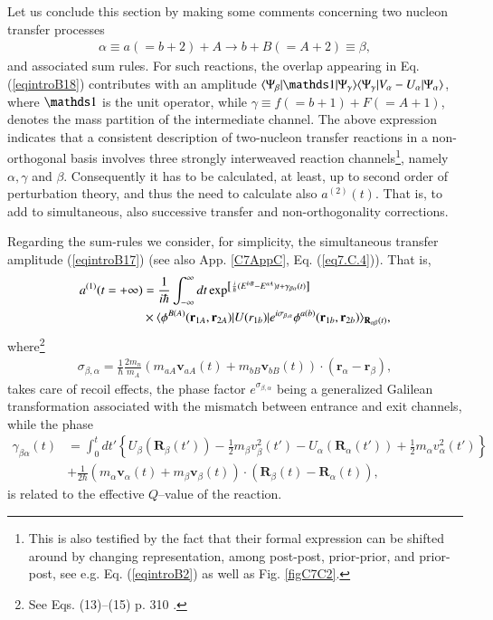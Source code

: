 \begin{subappendices}
 Let us conclude this section by making some comments concerning two nucleon transfer processes
 \begin{align}
 \alpha\equiv a (=b+2)+A\rightarrow b+B(=A+2)\equiv\beta,
 \end{align}
 and associated sum rules.
 For such reactions, the overlap appearing in Eq. (\ref{eqintroB18}) 
 contributes with an amplitude $\braket{\Psi_\beta|\idop|\Psi_\gamma}\braket{\Psi_\gamma|V_\alpha-U_\alpha|\Psi_\alpha}$, where $\idop$ is the unit operator, while $\gamma\equiv f(=b+1)+F(=A+1)$, denotes the mass partition of the intermediate channel. 
 The above expression indicates that a consistent description of two-nucleon transfer reactions in a non-orthogonal basis involves  three strongly interweaved  reaction channels\footnote{This is also testified by the fact that their formal expression can be shifted around by changing representation, among  post-post, prior-prior, and prior-post, see e.g. Eq. (\ref{eqintroB2}) as well as Fig. \ref{figC7C2}.}, namely $\alpha,\gamma$ and $\beta$. Consequently it has to be calculated, at least, up to second order of perturbation theory, and thus the need to calculate also $a^{(2)}(t)$. That is, to add to simultaneous, also successive transfer and non-orthogonality corrections.
 
 Regarding the sum-rules  we consider,  for simplicity, the simultaneous transfer amplitude (\ref{eqintroB17}) (see also App. \ref{C7AppC}, Eq. (\ref{eq7.C.4})). That is,
 \begin{align}\label{eqintroB19}
 \nonumber a^{(1)}(t=+\infty)&=\frac{1}{i\hbar}\int^{\infty}_{-\infty}dt\exp^{\left[\frac{i}{\hbar}(E^{bB}-E^{aA})t+\gamma_{\beta\alpha}(t)\right]}\\
 &\times\langle {\phi^{B(A)}(\mathbf r_{1A},\mathbf r_{2A})|U(r_{1b})|e^{i\sigma_{\beta,\alpha}}\phi^{a(b)}(\mathbf r_{1b},\mathbf r_{2b})} \rangle_{\mathbf R_{\alpha\beta}(t)},
 \end{align}
 where\footnote{See Eqs. (13)--(15) p. 310 \cite{Broglia:04a}.}
 \begin{align}
 \sigma_{\beta,\alpha}=\frac{1}{\hbar}\frac{2m_n}{m_A}(m_{aA}\mathbf v_{aA}(t)+m_{bB}\mathbf v_{bB}(t))\cdot(\mathbf r_\alpha-\mathbf r_\beta),
 \end{align}
 takes care of recoil effects, the phase factor $e^{\sigma_{\beta,\alpha}}$ being a generalized Galilean transformation associated with the mismatch between entrance and exit channels,  while the phase
 \begin{align}\label{eqintroB21}
 \nonumber\gamma_{\beta\alpha}(t)&=\int^t_0 dt'\left\{U_\beta(\mathbf R_{\beta}(t'))-\frac{1}{2}m_\beta v_\beta^2(t')-U_\alpha(\mathbf R_\alpha(t'))+\frac{1}{2}m_\alpha v_\alpha^2(t')\right\}\\
 &+\frac{1}{2\hbar}\left(m_\alpha \mathbf v_\alpha(t)+m_\beta \mathbf v_\beta(t) \right)\cdot(\mathbf R_\beta(t)-\mathbf R_\alpha(t)),
 \end{align}
 is related to the effective $Q$--value of the reaction.
 

\end{subappendices}
